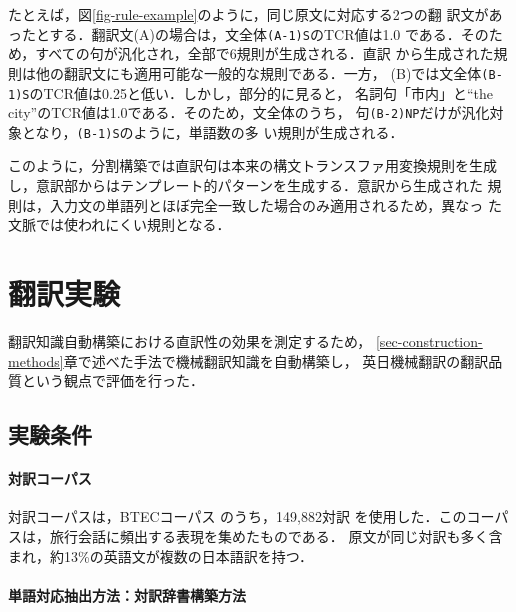 \begin{figure*}
\begin{center}
\leavevmode\epsfxsize=140mm
\caption{日英翻訳における生成規則例: 
(A) 直訳の場合
(B) 意訳からの分割構築の場合}
\label{fig-rule-example}
\end{center}
\end{figure*}

たとえば，図\ref{fig-rule-example}のように，同じ原文に対応する2つの翻
訳文があったとする．翻訳文(A)の場合は，文全体{\tt (A-1)S}のTCR値は1.0
である．そのため，すべての句が汎化され，全部で6規則が生成される．直訳
から生成された規則は他の翻訳文にも適用可能な一般的な規則である．一方，
(B)では文全体{\tt (B-1)S}のTCR値は0.25と低い．しかし，部分的に見ると，
名詞句「市内」と``the city''のTCR値は1.0である．そのため，文全体のうち，
句{\tt (B-2)NP}だけが汎化対象となり，{\tt (B-1)S}のように，単語数の多
い規則が生成される．

このように，分割構築では直訳句は本来の構文トランスファ用変換規則を生成
し，意訳部からはテンプレート的パターンを生成する．意訳から生成された
規則は，入力文の単語列とほぼ完全一致した場合のみ適用されるため，異なっ
た文脈では使われにくい規則となる．


\section{翻訳実験}
\label{sec-translation-experiments}

翻訳知識自動構築における直訳性の効果を測定するため，
\ref{sec-construction-methods}章で述べた手法で機械翻訳知識を自動構築し，
英日機械翻訳の翻訳品質という観点で評価を行った．

\subsection{実験条件}

\paragraph{対訳コーパス}

対訳コーパスは，BTECコーパス
\cite{Takezawa:PBCorpus2002,Kikui:BTECandMADCorpus}のうち，149,882対訳
を使用した．このコーパスは，旅行会話に頻出する表現を集めたものである．
原文が同じ対訳も多く含まれ，約13\%の英語文が複数の日本語訳を持つ．

\paragraph{単語対応抽出方法：対訳辞書構築方法}

